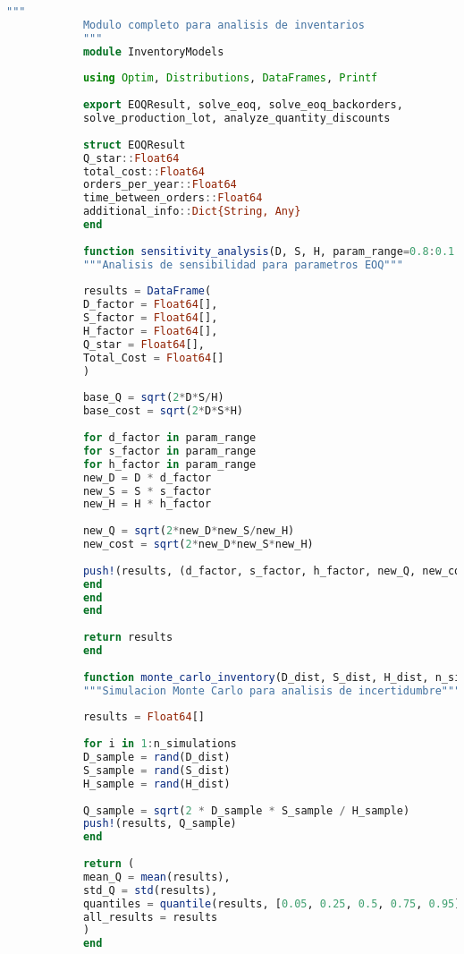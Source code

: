 \documentclass[12pt,a4paper]{book}
\begin{document}
	\begin{tcolorbox}[enhanced,colback=grisclaro,colframe=grisoScuro,boxrule=2pt,arc=8pt,
		title={\bfseries\color{white} \faTools\ HERRAMIENTAS ADICIONALES},breakable]
		
		\begin{lstlisting}[language=Julia,basicstyle=\footnotesize\ttfamily]
			"""
			Modulo completo para analisis de inventarios
			"""
			module InventoryModels
			
			using Optim, Distributions, DataFrames, Printf
			
			export EOQResult, solve_eoq, solve_eoq_backorders, 
			solve_production_lot, analyze_quantity_discounts
			
			struct EOQResult
			Q_star::Float64
			total_cost::Float64
			orders_per_year::Float64
			time_between_orders::Float64
			additional_info::Dict{String, Any}
			end
			
			function sensitivity_analysis(D, S, H, param_range=0.8:0.1:1.2)
			"""Analisis de sensibilidad para parametros EOQ"""
			
			results = DataFrame(
			D_factor = Float64[],
			S_factor = Float64[],
			H_factor = Float64[],
			Q_star = Float64[],
			Total_Cost = Float64[]
			)
			
			base_Q = sqrt(2*D*S/H)
			base_cost = sqrt(2*D*S*H)
			
			for d_factor in param_range
			for s_factor in param_range
			for h_factor in param_range
			new_D = D * d_factor
			new_S = S * s_factor
			new_H = H * h_factor
			
			new_Q = sqrt(2*new_D*new_S/new_H)
			new_cost = sqrt(2*new_D*new_S*new_H)
			
			push!(results, (d_factor, s_factor, h_factor, new_Q, new_cost))
			end
			end
			end
			
			return results
			end
			
			function monte_carlo_inventory(D_dist, S_dist, H_dist, n_simulations=1000)
			"""Simulacion Monte Carlo para analisis de incertidumbre"""
			
			results = Float64[]
			
			for i in 1:n_simulations
			D_sample = rand(D_dist)
			S_sample = rand(S_dist)
			H_sample = rand(H_dist)
			
			Q_sample = sqrt(2 * D_sample * S_sample / H_sample)
			push!(results, Q_sample)
			end
			
			return (
			mean_Q = mean(results),
			std_Q = std(results),
			quantiles = quantile(results, [0.05, 0.25, 0.5, 0.75, 0.95]),
			all_results = results
			)
			end
			

\end{lstlisting}
\end{tcolorbox}
\end{document}
